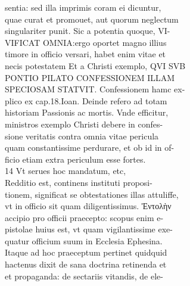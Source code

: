 \documentclass{article}
\begin{document}
\begin{pages}
                sentia: sed illa imprimis coram ei dicuntur, \\
                quae curat et promouet, aut quorum neglectum \\
                singulariter punit. Sic a potentia quoque, VI- \\
                VIFICAT OMNIA:ergo oportet magno illius \\
                timore in officio versari, habet enim vitae et \\
                necis potestatem Et a Christi exemplo, QVI SVB \\
                PONTIO PILATO CONFESSIONEM ILLAM \\
                SPECIOSAM STATVIT. Confessionem hamc ex- \\
                plico ex cap.18.Ioan. Deinde refero ad totam \\
                historiam Passionis ac mortis. Vnde efficitur, \\
                ministros exemplo Christi debere in confes- \\
                sione veritatis contra omnia vitae pericula \\
                quam constantissime perdurare, et ob id in of- \\
                ficio etiam extra periculum esse fortes. \\
                14 Vt serues hoc mandatum, etc, \\
                Redditio est, continens instituti proposi- \\
                tionem, significat se obtestationes illas attuliffe, \\
                vt in officio sit quam diligentissimus. Ἐντολὴν \\
                accipio pro officii praecepto: scopus enim e- \\
                pistolae huius est, vt quam vigilantissime exe- \\
                quatur officium suum in Ecclesia Ephesina. \\
                Itaque ad hoc praeceptum pertinet quidquid \\
                hactenus dixit de sana doctrina retinenda et \\
                et propaganda: de sectariis vitandis, de ele- \\

\end{pages}
\end{document}
